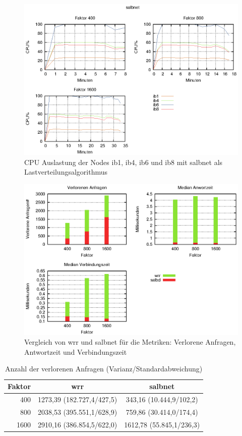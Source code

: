\documentclass[a4paper, 12pt, BCOR10mm, DIV12, toc=bibliography, toc=listof, german]{scrbook}
\begin{document}
			\begin{figure}
				\centering
				\includegraphics[width=14cm]{plots/cpu-salbnet}
				\caption{CPU Auslastung der Nodes ib1, ib4, ib6 und ib8 mit salbnet als
				Lastverteilungsalgorithmus}
				\label{fig:cpu-salbnet}
			\end{figure}

			\begin{figure}
				\centering
				\includegraphics[width=13cm]{plots/servload}
				\caption{Vergleich von wrr und salbnet für die Metriken: Verlorene Anfragen, Antwortzeit und	Verbindungszeit}
				\label{fig:ergebnis}
			\end{figure}

			\begin{table}
				\centering
				\begin{tabular}{|r|c|c|}\hline
					Faktor & wrr & salbnet \\\hline\hline
					400 & 1273,39 (182.727,4/427,5) & 343,16 (10.444,9/102,2)\\
					800 & 2038,53 (395.551,1/628,9) & 759,86 (30.414,0/174,4)\\
					1600 & 2910,16 (386.854,5/622,0) & 1612,78 (55.845,1/236,3)\\\hline
				\end{tabular}
				\caption{Anzahl der verlorenen Anfragen (Varianz/Standardabweichung)}
				\label{tab:timeout}
			\end{table}
\end{document}
